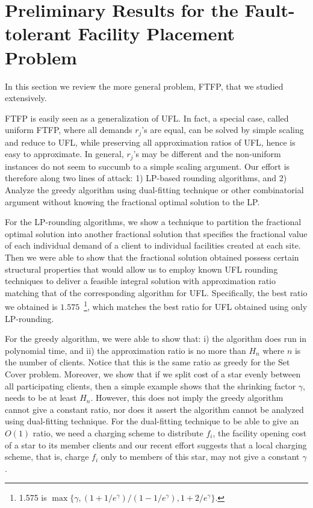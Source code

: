 \documentclass{article}[11pt]
\begin{document}
\section{Preliminary Results for the Fault-tolerant Facility Placement
  Problem}
In this section we review the more general problem, FTFP, that we
studied extensively.

FTFP is easily seen as a generalization of UFL. In fact, a special
case, called uniform FTFP, where all demands $r_j$'s are equal, can be
solved by simple scaling and reduce to UFL, while preserving all
approximation ratios of UFL, hence is easy to approximate. In general,
$r_j$'s may be different and the non-uniform instances do not seem to
succumb to a simple scaling argument. Our effort is therefore along
two lines of attack: 1) LP-based rounding algorithms, and 2) Analyze
the greedy algorithm using dual-fitting technique or other
combinatorial argument without knowing the fractional optimal solution
to the LP.

For the LP-rounding algorithms, we show a technique to partition the
fractional optimal solution into another fractional solution that
specifies the fractional value of each individual demand of a client
to individual facilities created at each site. Then we were able to
show that the fractional solution obtained possess certain structural
properties that would allow us to employ known UFL rounding techniques
to deliver a feasible integral solution with approximation ratio
matching that of the corresponding algorithm for UFL. Specifically,
the best ratio we obtained is $1.575$~\footnote{1.575 is
  $\max\{\gamma, (1+1/e^\gamma)/(1-1/e^\gamma), 1+2/e^\gamma\}$.},
which matches the best ratio for UFL obtained using only LP-rounding.

For the greedy algorithm, we were able to show that: i) the algorithm does
run in polynomial time, and ii) the approximation ratio is no more
than $H_n$ where $n$ is the number of clients. Notice that this is the
same ratio as greedy for the Set Cover problem. Moreover, we show that
if we split cost of a star evenly between all participating clients,
then a simple example shows that the shrinking factor $\gamma$, needs
to be at least $H_n$. However, this does not imply the greedy
algorithm cannot give a constant ratio, nor does it assert the
algorithm cannot be analyzed using dual-fitting technique. For the
dual-fitting technique to be able to give an $O(1)$ ratio, we need a
charging scheme to distribute $f_i$, the facility opening cost of a
star to its member clients and our recent effort suggests that a local
charging scheme, that is, charge $f_i$ only to members of this star,
may not give a constant $\gamma$.
\end{document}
